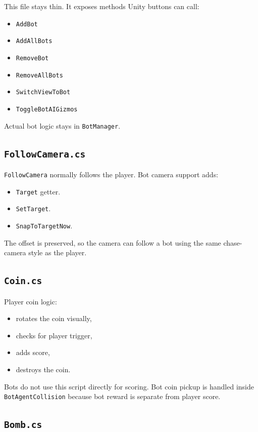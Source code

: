 \documentclass[11pt]{article}
\newcommand{\file}[1]{\texttt{#1}}
\newcommand{\code}[1]{{\footnotesize\texttt{#1}}}
\begin{document}
This file stays thin. It exposes methods Unity buttons can call:

\begin{itemize}
    \item \code{AddBot}
    \item \code{AddAllBots}
    \item \code{RemoveBot}
    \item \code{RemoveAllBots}
    \item \code{SwitchViewToBot}
    \item \code{ToggleBotAIGizmos}
\end{itemize}

Actual bot logic stays in \code{BotManager}.

\subsection{\file{FollowCamera.cs}}

\code{FollowCamera} normally follows the player. Bot camera support adds:

\begin{itemize}
    \item \code{Target} getter.
    \item \code{SetTarget}.
    \item \code{SnapToTargetNow}.
\end{itemize}

The offset is preserved, so the camera can follow a bot using the same chase-camera style as the player.

\subsection{\file{Coin.cs}}

Player coin logic:

\begin{itemize}
    \item rotates the coin visually,
    \item checks for player trigger,
    \item adds score,
    \item destroys the coin.
\end{itemize}

Bots do not use this script directly for scoring. Bot coin pickup is handled inside \code{BotAgentCollision} because bot reward is separate from player score.

\subsection{\file{Bomb.cs}}
\end{document}
